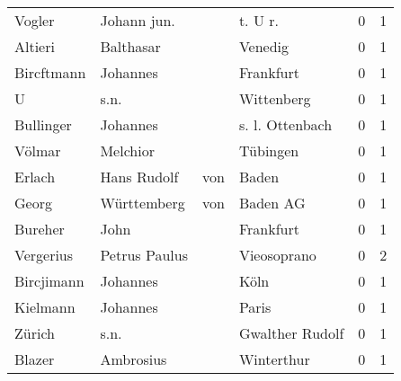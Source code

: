 \begin{tabular}{llllrr}
                   Vogler &                        Johann jun. &             &                                    t. U r.  &          0 &         1 \\
                  Altieri &                          Balthasar &             &                                     Venedig &          0 &         1 \\
               Bircftmann &                           Johannes &             &                                   Frankfurt &          0 &         1 \\
                        U &                               s.n. &             &                                  Wittenberg &          0 &         1 \\
                Bullinger &                           Johannes &             &                             s. l. Ottenbach &          0 &         1 \\
                   Völmar &                           Melchior &             &                                    Tübingen &          0 &         1 \\
                   Erlach &                        Hans Rudolf &         von &                                       Baden &          0 &         1 \\
                    Georg &                        Württemberg &         von &                                    Baden AG &          0 &         1 \\
                  Bureher &                               John &             &                                   Frankfurt &          0 &         1 \\
                Vergerius &                      Petrus Paulus &             &                                 Vieosoprano &          0 &         2 \\
               Bircjimann &                           Johannes &             &                                        Köln &          0 &         1 \\
                 Kielmann &                           Johannes &             &                                       Paris &          0 &         1 \\
                   Zürich &                               s.n. &             &                             Gwalther Rudolf &          0 &         1 \\
                   Blazer &                          Ambrosius &             &                                  Winterthur &          0 &         1 \\

\end{tabular}
